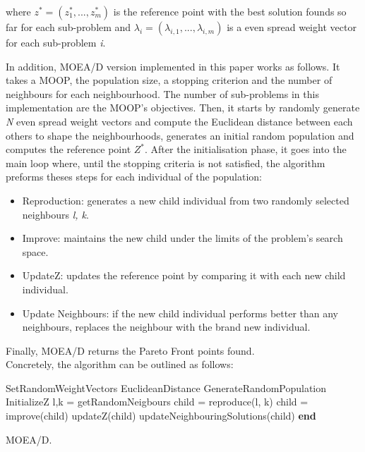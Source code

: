 where $z^{*} = (z^{*}_{1}, ..., z^{*}_{m})$ is the reference point with the best solution founds so far for each sub-problem and $\lambda_{i} = (\lambda_{i,1}, ..., \lambda_{i,m})$ is a even spread weight vector for each sub-problem \textit{i}.

In addition, MOEA/D version implemented in this paper works as follows. It takes a MOOP, the population size, a stopping criterion and the number of neighbours for each neighbourhood. The number of sub-problems in this implementation are the MOOP's objectives. Then, it starts by randomly generate \textit{N} even spread weight vectors and compute the Euclidean distance between each others to shape the neighbourhoods, generates an initial random population and computes the reference point $Z^{*}$. After the initialisation phase, it goes into the main loop where, until the stopping criteria is not satisfied, the algorithm preforms theses steps for each individual of the population:
\begin{itemize}
  \item Reproduction: generates a new child individual from two randomly selected neighbours \textit{l, k}.
  \item Improve: maintains the new child under the limits of the problem's search space.
  \item UpdateZ: updates the reference point by comparing it with each new child individual.
  \item Update Neighbours: if the new child individual performs better than any neighbours, replaces the neighbour with the brand new individual.
\end{itemize}
Finally, MOEA/D returns the Pareto Front points found. \\

Concretely, the algorithm can be outlined as follows: \\
\begin{algorithm}[H]
\begin{algorithmic}[1]
  \State SetRandomWeightVectors\;
  \State EuclideanDistance\;
  \State GenerateRandomPopulation\;
  \State InitializeZ\;
      \State l,k = getRandomNeigbours\;
      \State child = reproduce(l, k)\;
      \State child = improve(child)\;
      \State updateZ(child)\;
      \State updateNeighbouringSolutions(child)\;
    \EndFor 
    \EndWhile
    \State \textbf{end}
\end{algorithmic}
\caption{MOEA/D.}
\end{algorithm}

